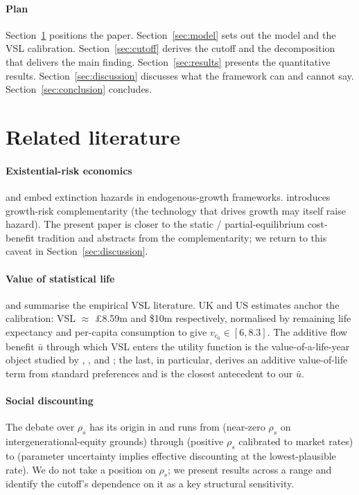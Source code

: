 \documentclass{_latex/house}
\begin{document}
\paragraph{Plan} Section~\ref{sec:lit} positions the paper. Section~\ref{sec:model} sets out the model and the VSL calibration. Section~\ref{sec:cutoff} derives the cutoff and the decomposition that delivers the main finding. Section~\ref{sec:results} presents the quantitative results. Section~\ref{sec:discussion} discusses what the framework can and cannot say. Section~\ref{sec:conclusion} concludes.

\section{Related literature}
\label{sec:lit}

\paragraph{Existential-risk economics} \citet{aschenbrenner2020existential} and \citet{trammell2020existential} embed extinction hazards in endogenous-growth frameworks. \citet{jones2024aidilemma} introduces growth-risk complementarity (the technology that drives growth may itself raise hazard). The present paper is closer to the static / partial-equilibrium cost-benefit tradition and abstracts from the complementarity; we return to this caveat in Section~\ref{sec:discussion}.

\paragraph{Value of statistical life} \citet{viscusi2018pricing} and \citet{viscusi2003vsl} summarise the empirical VSL literature. UK and US estimates anchor the calibration: VSL $\approx$ \pounds 8.59m and \$10m respectively, normalised by remaining life expectancy and per-capita consumption to give $v_{c_0} \in [6, 8.3]$. The additive flow benefit $\bar u$ through which VSL enters the utility function is the value-of-a-life-year object studied by \citet{rosen1988value}, \citet{murphy2006value}, and \citet{hall2007value}; the last, in particular, derives an additive value-of-life term from standard preferences and is the closest antecedent to our $\bar u$.

\paragraph{Social discounting} The debate over $\rho_s$ has its origin in \citet{ramsey1928mathematical} and runs from \citet{stern2007economics} (near-zero $\rho_s$ on intergenerational-equity grounds) through \citet{nordhaus2007review,nordhaus2017evolution} (positive $\rho_s$ calibrated to market rates) to \citet{weitzman1998gamma,weitzman2007review} (parameter uncertainty implies effective discounting at the lowest-plausible rate). We do not take a position on $\rho_s$; we present results across a range and identify the cutoff's dependence on it as a key structural sensitivity.
\end{document}
